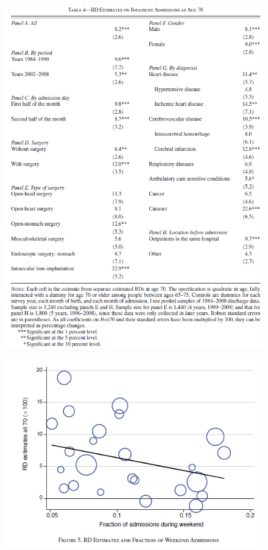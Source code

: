 \documentclass[../root]{subfiles}
\begin{document}
    \begin{figure}[ht]
      \centering
      \includegraphics[scale = .8]{0710tanji/T4}
    \end{figure}

    \begin{figure}[ht]
      \centering
      \includegraphics[scale = 1]{0710tanji/F5}
    \end{figure}
\end{document}
